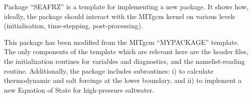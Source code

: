 
Package ``SEAFRZ'' is a template for implementing a new package.
It shows how, ideally, the package should interact with the
MITgcm kernel on various levels (initialisation, time-stepping,
post-processing).

This package has been modified from the MITgcm ``MYPACKAGE'' template.
The only components of the template which are relevant here are the header
files, the initialization routines for variables and diagnostics, and the
namelist-reading routine. Additionally, the package includes subroutines:
i)  to calculate thermodynamic and salt forcings at the lower boundary, and
ii) to implement a new Equation of State for high-pressure saltwater.
